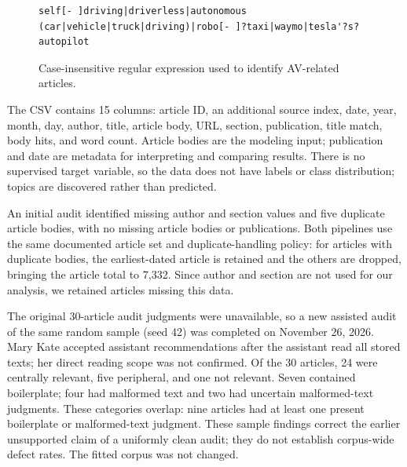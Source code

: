 \documentclass[conference]{IEEEtran}
\begin{document}
\begin{figure}[H]
\centering
\begin{lstlisting}
self[- ]driving|driverless|autonomous (car|vehicle|truck|driving)|robo[- ]?taxi|waymo|tesla'?s? autopilot
\end{lstlisting}
\caption{Case-insensitive regular expression used to identify AV-related articles.}
\label{fig:regex}
\end{figure}

The CSV contains 15 columns: article ID, an additional source index, date, year, month, day, author, title, article body, URL, section, publication, title match, body hits, and word count. Article bodies are the modeling input; publication and date are metadata for interpreting and comparing results. There is no supervised target variable, so the data does not have labels or class distribution; topics are discovered rather than predicted.

An initial audit identified missing author and section values and five duplicate article bodies, with no missing article bodies or publications. Both pipelines use the same documented article set and duplicate-handling policy: for articles with duplicate bodies, the earliest-dated article is retained and the others are dropped, bringing the article total to 7,332. Since author and section are not used for our analysis, we retained articles missing this data.

The original 30-article audit judgments were unavailable, so a new assisted audit of the same random sample (seed 42) was completed on November 26, 2026. Mary Kate accepted assistant recommendations after the assistant read all stored texts; her direct reading scope was not confirmed. Of the 30 articles, 24 were centrally relevant, five peripheral, and one not relevant. Seven contained boilerplate; four had malformed text and two had uncertain malformed-text judgments. These categories overlap: nine articles had at least one present boilerplate or malformed-text judgment. These sample findings correct the earlier unsupported claim of a uniformly clean audit; they do not establish corpus-wide defect rates. The fitted corpus was not changed.
\end{document}
